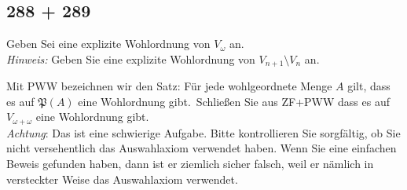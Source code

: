 \subsection*{288 + 289}


\begin{exercise}[288]

Geben Sei eine explizite Wohlordnung von $V_{\omega}$ an. \\
\textit{Hinweis:} Geben Sie eine explizite Wohlordnung von $V_{n+1} \setminus V_n$ an.
\end{exercise}


\begin{solution}

\phantom{}

\end{solution}


\begin{exercise}[289]

Mit PWW bezeichnen wir den Satz: \glqq Für jede wohlgeordnete Menge $A$ gilt,
dass es auf $\mathfrak{P}(A)$ eine Wohlordnung gibt.\grqq\
Schließen Sie aus ZF+PWW dass es auf $V_{\omega + \omega}$ eine Wohlordnung gibt. \\
\textit{Achtung}: Das ist eine schwierige Aufgabe. Bitte kontrollieren Sie sorgfältig,
ob Sie nicht versehentlich das Auswahlaxiom verwendet haben. Wenn Sie eine einfachen
Beweis gefunden haben, dann ist er ziemlich sicher falsch, weil er nämlich in
versteckter Weise das Auswahlaxiom verwendet.

\end{exercise}


\begin{solution}

\phantom{}

\end{solution}

